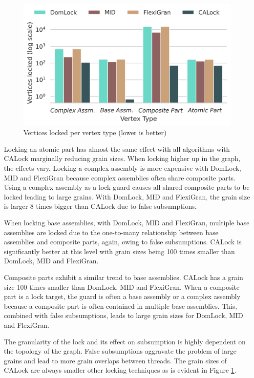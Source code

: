 \begin{figure}[h]
	\centering
	\captionsetup{justification=centering}
	\includegraphics[width=.7\columnwidth]{figures/PerformanceCharts/ContainmentRatio}
	\caption{Vertices locked per vertex type (lower is better)}
	\label{nodesLockedPerNodeType}
\end{figure}

Locking an atomic part has almost the same effect with all algorithms with CALock marginally reducing grain sizes. 
When locking higher up in the graph, the effects vary. 
Locking a complex assembly is more expensive with DomLock, MID and FlexiGran because complex assemblies often share composite parts. Using a complex assembly as a lock guard causes all shared composite parts to be locked leading to large grains. With DomLock, MID and FlexiGran, the grain size is larger 8 times bigger than CALock due to false subsumptions. 

When locking base assemblies, with DomLock, MID and FlexiGran, multiple base assemblies are locked due to the one-to-many relationship between base assemblies and composite parts, again, owing to false subsumptions. CALock is significantly better at this level with grain sizes being 100 times smaller than DomLock, MID and FlexiGran.

Composite parts exhibit a similar trend to base assemblies. CALock has a grain size 100 times smaller than DomLock, MID and FlexiGran. When a composite part is a lock target, the guard is often a base assembly or a complex assembly because a composite part is often contained in multiple base assemblies. This, combined with false subsumptions, leads to large grain sizes for DomLock, MID and FlexiGran.

The granularity of the lock and its effect on subsumption is highly dependent on the topology of the graph. 
False subsumptions aggravate the problem of large grains and lead to more grain overlaps between threads. 
The grain sizes of CALock are always smaller other locking techniques as is evident in Figure \ref{nodesLockedPerNodeType}.


